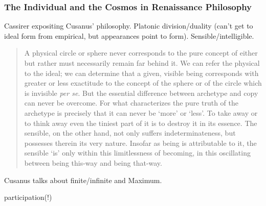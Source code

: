 \subsubsection{The Individual and the Cosmos in Renaissance Philosophy}

Cassirer expositing Cusanus' philosophy.  Platonic division/duality (can't get to ideal form from empirical, but appearances point to form).  Sensible/intelligible.



\begin{quote}
    A physical circle or sphere never corresponds to the pure concept of either but rather must necessarily remain far behind it.  We can refer the physical to the ideal; we can determine that a given, visible being corresponds with greater or less exactitude to the concept of the sphere or of the circle which is invisible \emph{per se}.  But the essential difference between archetype and copy can never be overcome.  For what characterizes the pure truth of the archetype is precisely that it can never be `more' or `less'.  To take away or to think away even the tiniest part of it is to destroy it in its essence.  The sensible, on the other hand, not only suffers indeterminateness, but possesses therein its very nature.  Insofar as being is attributable to it, the sensible `is' only within this limitlessness of becoming, in this oscillating between being this-way and being that-way.  \citep[p. 21]{Cassirer1927}
\end{quote}

Cusanus talks about finite/infinite and Maximum.  

participation(!)

